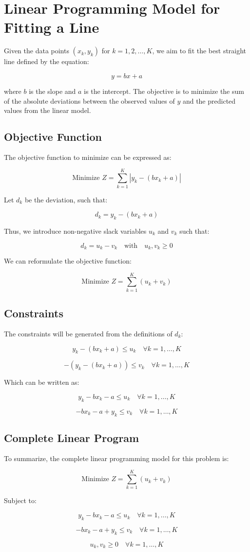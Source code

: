 \documentclass{article}
\begin{document}
\section*{Linear Programming Model for Fitting a Line}

Given the data points \((x_k, y_k)\) for \(k = 1, 2, \ldots, K\), we aim to fit the best straight line defined by the equation:

\[
y = bx + a
\]

where \(b\) is the slope and \(a\) is the intercept. The objective is to minimize the sum of the absolute deviations between the observed values of \(y\) and the predicted values from the linear model.

\subsection*{Objective Function}

The objective function to minimize can be expressed as:

\[
\text{Minimize } Z = \sum_{k=1}^{K} |y_k - (bx_k + a)|
\]

Let \(d_k\) be the deviation, such that:

\[
d_k = y_k - (bx_k + a)
\]

Thus, we introduce non-negative slack variables \(u_k\) and \(v_k\) such that:

\[
d_k = u_k - v_k \quad \text{with} \quad u_k, v_k \geq 0
\]

We can reformulate the objective function:

\[
\text{Minimize } Z = \sum_{k=1}^{K} (u_k + v_k)
\]

\subsection*{Constraints}

The constraints will be generated from the definitions of \(d_k\):

\[
y_k - (bx_k + a) \leq u_k \quad \forall k = 1, \ldots, K
\]

\[
-(y_k - (bx_k + a)) \leq v_k \quad \forall k = 1, \ldots, K
\]

Which can be written as:

\[
y_k - bx_k - a \leq u_k \quad \forall k = 1, \ldots, K
\]

\[
-bx_k - a + y_k \leq v_k \quad \forall k = 1, \ldots, K
\]

\subsection*{Complete Linear Program}

To summarize, the complete linear programming model for this problem is:

\[
\text{Minimize } Z = \sum_{k=1}^{K} (u_k + v_k)
\]

Subject to:

\[
y_k - bx_k - a \leq u_k \quad \forall k = 1, \ldots, K
\]

\[
-bx_k - a + y_k \leq v_k \quad \forall k = 1, \ldots, K
\]

\[
u_k, v_k \geq 0 \quad \forall k = 1, \ldots, K
\]
\end{document}
